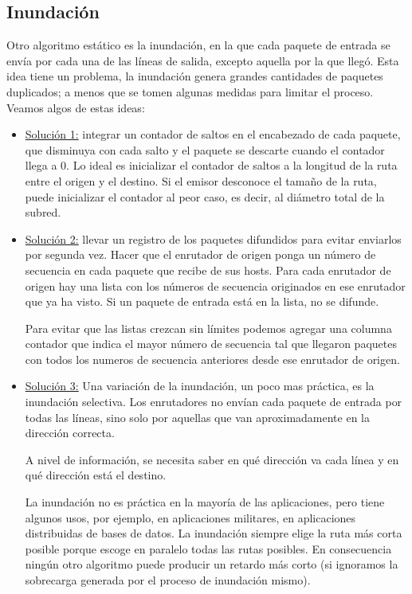 \documentclass[10pt,a4paper]{report}
\begin{document}
\subsection{Inundación}
	\par Otro algoritmo estático es la inundación, en la que cada paquete de entrada se 
	envía por cada una de las líneas de salida, excepto aquella por la que llegó.
    Esta idea tiene un problema, la inundación genera grandes cantidades de paquetes 
    duplicados; a menos que se tomen algunas medidas para limitar el proceso. Veamos 
    algos de estas ideas:

	\begin{itemize}
		\item \underline{Solución 1:} integrar un contador de saltos en el encabezado de cada 
		paquete, que disminuya con cada salto y el paquete se descarte cuando el 
		contador llega a 0. Lo ideal es inicializar el contador de saltos a la longitud de la 
		ruta entre el origen y el destino. Si el emisor desconoce el tamaño de la ruta, 
		puede inicializar el contador al peor caso, es decir, al diámetro total de la subred.
		
		\item \underline{Solución 2:} llevar un registro de los paquetes difundidos para evitar 
		enviarlos por segunda vez. Hacer que el enrutador de origen ponga un número de 
		secuencia en cada paquete que recibe de sus hosts. Para cada enrutador de origen 
		hay una lista con los números de secuencia originados en ese enrutador que ya ha 
		visto. Si un paquete de entrada está en la lista, no se difunde.

		\par Para evitar que las listas crezcan sin límites podemos agregar una columna 
		contador que indica el mayor número de secuencia tal que llegaron paquetes con 
		todos los numeros de secuencia anteriores desde ese enrutador de origen.
		
		\item \underline{Solución 3:} Una variación de la inundación, un poco mas práctica, es la 
		inundación selectiva. Los enrutadores no envían cada paquete de entrada por 
		todas las líneas, sino solo por aquellas que van aproximadamente en la dirección 
		correcta.

		\par A nivel de información, se necesita saber en qué  dirección va cada línea y en qué 
		dirección está el destino.
		
		\par La inundación no es práctica en la mayoría de las aplicaciones, pero tiene
		algunos usos, por ejemplo, en aplicaciones militares, en aplicaciones distribuidas 
		de bases de datos. La inundación siempre elige la ruta más corta posible porque 
		escoge en paralelo todas las rutas posibles. En consecuencia ningún otro 
		algoritmo puede producir un retardo más corto (si ignoramos la sobrecarga 
		generada por el proceso de inundación mismo).
		
	\end{itemize}
		
\end{document}
